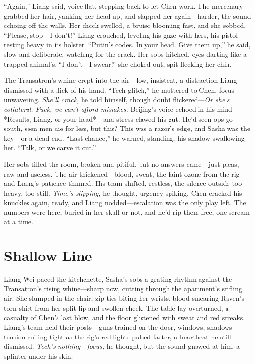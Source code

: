 \documentclass[12pt]{book}
\begin{document}
“Again,” Liang said, voice flat, stepping back to let Chen work. The mercenary grabbed her hair, yanking her head up, and slapped her again—harder, the sound echoing off the walls. Her cheek swelled, a bruise blooming fast, and she sobbed, “Please, stop—I don’t!” Liang crouched, leveling his gaze with hers, his pistol resting heavy in its holster. “Putin’s codes. In your head. Give them up,” he said, slow and deliberate, watching for the crack. Her sobs hitched, eyes darting like a trapped animal’s. “I don’t—I swear!” she choked out, spit flecking her chin.

The Transatron’s whine crept into the air—low, insistent, a distraction Liang dismissed with a flick of his hand. “Tech glitch,” he muttered to Chen, focus unwavering. \textit{She’ll crack,} he told himself, though doubt flickered—\textit{Or she’s collateral. Fuck, we can’t afford mistakes.} Beijing’s voice echoed in his mind—*Results, Liang, or your head*—and stress clawed his gut. He’d seen ops go south, seen men die for less, but this? This was a razor’s edge, and Sasha was the key—or a dead end. “Last chance,” he warned, standing, his shadow swallowing her. “Talk, or we carve it out.”

Her sobs filled the room, broken and pitiful, but no answers came—just pleas, raw and useless. The air thickened—blood, sweat, the faint ozone from the rig—and Liang’s patience thinned. His team shifted, restless, the silence outside too heavy, too still. \textit{Time’s slipping,} he thought, urgency spiking. Chen cracked his knuckles again, ready, and Liang nodded—escalation was the only play left. The numbers were here, buried in her skull or not, and he’d rip them free, one scream at a time.

\section{Shallow Line}

Liang Wei paced the kitchenette, Sasha’s sobs a grating rhythm against the Transatron’s rising whine—sharp now, cutting through the apartment’s stifling air. She slumped in the chair, zip-ties biting her wrists, blood smearing Raven’s torn shirt from her split lip and swollen cheek. The table lay overturned, a casualty of Chen’s last blow, and the floor glistened with sweat and red streaks. Liang’s team held their posts—guns trained on the door, windows, shadows—tension coiling tight as the rig’s red lights pulsed faster, a heartbeat he still dismissed. \textit{Tech’s nothing—focus,} he thought, but the sound gnawed at him, a splinter under his skin.
\end{document}
